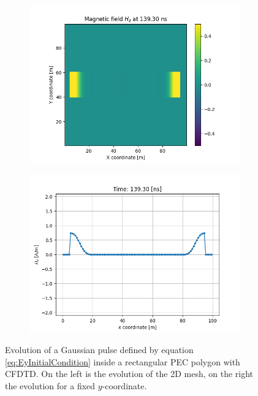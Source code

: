 \documentclass[12pt, oneside]{book}
\begin{document}
\begin{figure}[H]
    \begin{subfigure}[b]{0.49\textwidth}
        \centering
        \includegraphics[width=\textwidth]{Imagenes/CFDTD2D_GaussianY4.png}
    \end{subfigure}
    \begin{subfigure}[b]{0.49\textwidth}
        \centering
        \includegraphics[width=\textwidth]{Imagenes/CFDTD2D_GaussianY4_1D.png}
    \end{subfigure}
    \caption{Evolution of a Gaussian pulse defined by equation \ref{eq:EyInitialCondition} inside a rectangular PEC polygon with CFDTD. On the left is the evolution of the 2D mesh, on the right the evolution for a fixed $y$-coordinate.}
\label{fig:CFDTD2D_GaussianEy}
\end{figure}
\end{document}
